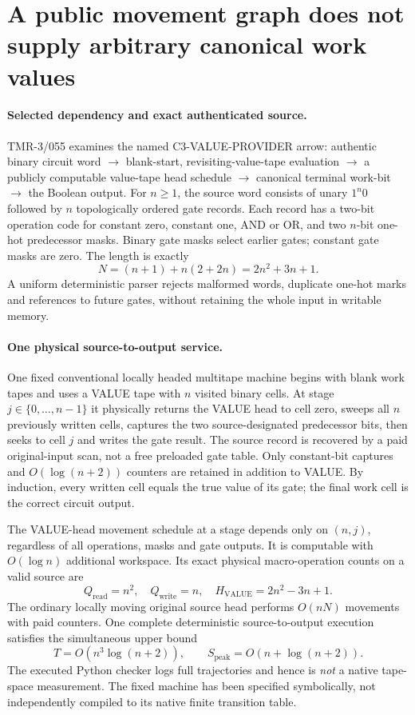 \documentclass[11pt]{article}
\begin{document}
\section{A public movement graph does not supply arbitrary canonical work values}
\paragraph{Selected dependency and exact authenticated source.}
TMR-3/055 examines the named \textsf{C3-VALUE-PROVIDER} arrow:
authentic binary circuit word $\to$ blank-start, revisiting-value-tape
evaluation $\to$ a publicly computable value-tape head schedule
$\to$ canonical terminal work-bit $\to$ the Boolean output.
For $n\ge1$, the source word consists of unary $1^n0$ followed by $n$
topologically ordered gate records. Each record has a two-bit operation
code for constant zero, constant one, AND or OR, and two $n$-bit
one-hot predecessor masks. Binary gate masks select earlier gates;
constant gate masks are zero. The length is exactly
\[
N= (n+1)+n(2+2n)=2n^2+3n+1.
\]
A uniform deterministic parser rejects malformed words, duplicate
one-hot marks and references to future gates, without retaining
the whole input in writable memory.

\paragraph{One physical source-to-output service.}
One fixed conventional locally headed multitape machine begins
with blank work tapes and uses a VALUE tape with $n$ visited
binary cells. At stage $j\in\{0,\ldots,n-1\}$ it physically
returns the VALUE head to cell zero, sweeps all $n$ previously
written cells, captures the two source-designated predecessor
bits, then seeks to cell $j$ and writes the gate result.
The source record is recovered by a paid original-input scan,
not a free preloaded gate table. Only constant-bit captures
and $O(\log(n+2))$ counters are retained in addition to VALUE.
By induction, every written cell equals the true value of its
gate; the final work cell is the correct circuit output.

The VALUE-head movement schedule at a stage depends only on
$(n,j)$, regardless of all operations, masks and gate outputs.
It is computable with $O(\log n)$ additional workspace. Its
exact physical macro-operation counts on a valid source are
\[
Q_{\mathrm{read}}=n^2,\quad Q_{\mathrm{write}}=n,\quad
H_{\mathrm{VALUE}}=2n^2-3n+1.
\]
The ordinary locally moving original source head performs
$O(nN)$ movements with paid counters. One complete deterministic
source-to-output execution satisfies the simultaneous upper bound
\[
T=O(n^3\log(n+2)),\qquad
S_{\mathrm{peak}}=O(n+\log(n+2)).
\]
The executed Python checker logs full trajectories and hence is
\emph{not} a native tape-space measurement. The fixed machine
has been specified symbolically, not independently compiled
to its native finite transition table.
\end{document}
